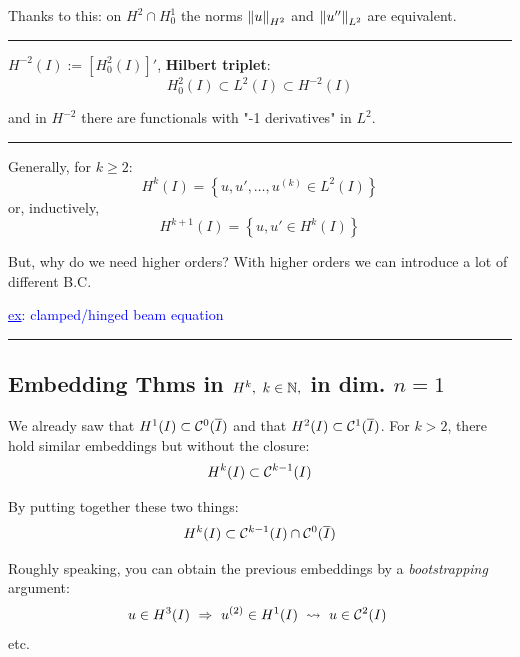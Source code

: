 Thanks to this: on $H^2\cap H^1_0$ the norms $\left\lVert u \right\rVert_{H^2}$ and $\left\lVert u'' \right\rVert_{L^2}$ are equivalent.

\rule{0.31\textwidth}{0.2pt}
\smallskip

$H^{-2}(I):=\left[ H^2_0(I) \right]'$, \textbf{Hilbert triplet}:
\begin{equation*}
H_0^2(I)\subset L^2(I) \subset H^{-2}(I)
\end{equation*}

and in $H^{-2}$ there are functionals with "-1 derivatives" in $L^2$.

\rule{0.31\textwidth}{0.2pt}
\smallskip

Generally, for $k\geq 2$:
\begin{equation*}
H^k(I)=\left\{ u,u',\dots,u^{(k)}\in L^2(I) \right\}
\end{equation*}
or, inductively,
\begin{equation*}
H^{k+1}(I)=\left\{ u,u'\in H^{k}(I) \right\}
\end{equation*}

But, why do we need higher orders? With higher orders we can introduce a lot of different B.C.

\textcolor{blue}{\underline{ex}: clamped/hinged beam equation}

\rule{0.31\textwidth}{0.2pt}


\subsection{\color{red}Embedding Thms in \texorpdfstring{$H^k,\ k\in\mathbb{N},$}{C} in dim. \texorpdfstring{$n=1$}{C}}


We already saw that $H^1(I)\subset \mathcal{C}^0(\overline{I})$ and that $H^2(I)\subset \mathcal{C}^1(\overline{I})$. For $k>2$, there hold similar embeddings but without the closure:
\begin{equation*}
H^k(I)\subset \mathcal{C}^{k-1}(I)
\end{equation*}

By putting together these two things:
\begin{equation*}
H^k(I)\subset \mathcal{C}^{k-1}(I)\cap\mathcal{C}^0(\overline{I})
\end{equation*}

Roughly speaking, you can obtain the previous embeddings by a \emph{bootstrapping} argument:
\begin{equation*}
u\in H^3(I)\ \Rightarrow \ u^{(2)}\in H^1(I) \ \leadsto \ u\in\Cc^2(I)\ 
\end{equation*}
etc.

